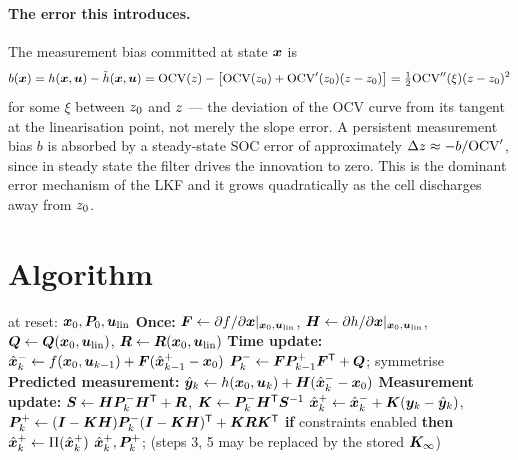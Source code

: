 \paragraph{The error this introduces.} The measurement bias committed at state $\bm{x}$ is
\begin{equation}
b(\bm{x}) = h(\bm{x},\bm{u}) - \tilde h(\bm{x},\bm{u}) = \mathrm{OCV}(z) - \left[\mathrm{OCV}(z_0) + \mathrm{OCV}'(z_0)(z-z_0)\right]
 = \tfrac12 \mathrm{OCV}''(\xi)(z-z_0)^2
\label{eq:lkf-bias}
\end{equation}
for some $\xi$ between $z_0$ and $z$ --- the deviation of the OCV curve from its
tangent at the linearisation point, not merely the slope error. A persistent measurement
bias $b$ is absorbed by a steady-state SOC error of approximately
$\Delta z \approx -b/\mathrm{OCV}'$, since in steady state the filter drives the innovation to
zero. This is the dominant error mechanism of the LKF and it grows quadratically as the cell
discharges away from $z_0$.

\section{Algorithm}
\begin{algorithm}[H]
\caption{LKF --- initialisation and one sampling period}
\begin{algorithmic}[1]
\Require at reset: $\bm{x}_0, \bm{P}_0, \bm{u}_{\text{lin}}$
\State \textbf{Once:} $\bm{F}\gets \partial f/\partial\bm{x}|_{\bm{x}_0,\bm{u}_{\text{lin}}}$,\;
       $\bm{H}\gets \partial h/\partial\bm{x}|_{\bm{x}_0,\bm{u}_{\text{lin}}}$,\;
       $\bm{Q}\gets\bm{Q}(\bm{x}_0,\bm{u}_{\text{lin}})$,\; $\bm{R}\gets\bm{R}(\bm{x}_0,\bm{u}_{\text{lin}})$
\State \textbf{Time update:} $\hat{\bm{x}}^{-}_k\gets f(\bm{x}_0,\bm{u}_{k-1}) + \bm{F}(\hat{\bm{x}}^{+}_{k-1}-\bm{x}_0)$
\State $\bm{P}^{-}_k \gets \bm{F}\bm{P}^{+}_{k-1}\bm{F}^{\mathsf{T}}+\bm{Q}$; symmetrise
\State \textbf{Predicted measurement:} $\hat{\bm{y}}_k \gets h(\bm{x}_0,\bm{u}_k) + \bm{H}(\hat{\bm{x}}^{-}_k-\bm{x}_0)$
\State \textbf{Measurement update:} $\bm{S}\gets\bm{H}\bm{P}^{-}_k\bm{H}^{\mathsf{T}}+\bm{R}$,\;
       $\bm{K}\gets\bm{P}^{-}_k\bm{H}^{\mathsf{T}}\bm{S}^{-1}$
\State $\hat{\bm{x}}^{+}_k\gets\hat{\bm{x}}^{-}_k+\bm{K}(\bm{y}_k-\hat{\bm{y}}_k)$,\;
       $\bm{P}^{+}_k\gets(\bm{I}-\bm{K}\bm{H})\bm{P}^{-}_k(\bm{I}-\bm{K}\bm{H})^{\mathsf{T}}+\bm{K}\bm{R}\bm{K}^{\mathsf{T}}$
\State \textbf{if} constraints enabled \textbf{then} $\hat{\bm{x}}^{+}_k\gets\Pi(\hat{\bm{x}}^{+}_k)$
\Ensure $\hat{\bm{x}}^{+}_k,\bm{P}^{+}_k$; \quad (steps 3, 5 may be replaced by the stored $\bm{K}_\infty$)
\end{algorithmic}
\end{algorithm}


